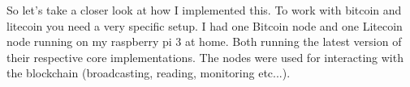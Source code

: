 So let's take a closer look at how I implemented this. To work with bitcoin and litecoin you
need a very specific setup. I had one Bitcoin node and one Litecoin node running on my raspberry pi 3
at home. Both running the latest version of their respective core implementations. The nodes were used 
for interacting with the blockchain (broadcasting, reading, monitoring etc...).